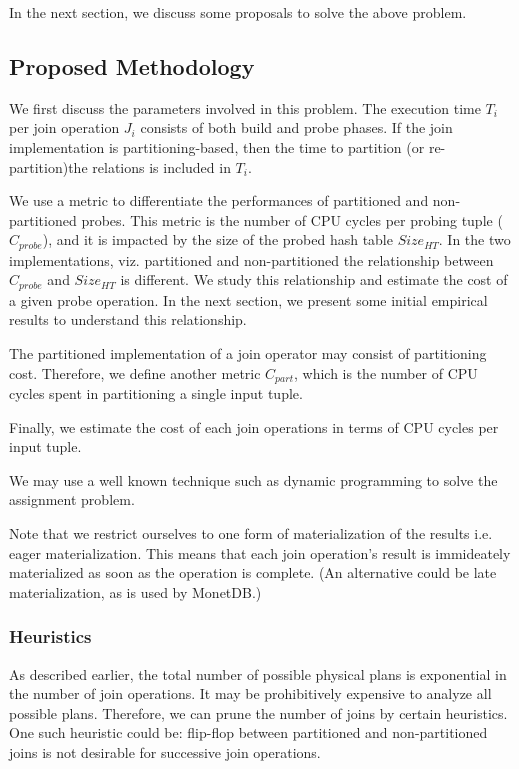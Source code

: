 In the next section, we discuss some proposals to solve the above problem. 

\subsection{Proposed Methodology}
We first discuss the parameters involved in this problem. 
The execution time $T_i$ per join operation $J_i$ consists of both build and probe phases.
If the join implementation is partitioning-based, then the time to partition (or re-partition)the relations is included in $T_i$.
 
We use a metric to differentiate the performances of partitioned and non-partitioned probes. 
This metric is the number of CPU cycles per probing tuple ($C_{probe}$), and it is impacted by the size of the probed hash table $Size_{HT}$. 
In the two implementations, viz. partitioned and non-partitioned the relationship between $C_{probe}$ and $Size_{HT}$ is different. 
We study this relationship and estimate the cost of a given probe operation. 
In the next section, we present some initial empirical results to understand this relationship.

The partitioned implementation of a join operator may consist of partitioning cost. 
Therefore, we define another metric $C_{part}$, which is the number of CPU cycles spent in partitioning a single input tuple. 

Finally, we estimate the cost of each join operations in terms of CPU cycles per input tuple. 

We may use a well known technique such as dynamic programming to solve the assignment problem. 

Note that we restrict ourselves to one form of materialization of the results i.e. eager materialization. 
This means that each join operation's result is immideately materialized as soon as the operation is complete. 
(An alternative could be late materialization, as is used by MonetDB.)

\subsubsection{Heuristics}
As described earlier, the total number of possible physical plans is exponential in the number of join operations. 
It may be prohibitively expensive to analyze all possible plans. 
Therefore, we can prune the number of joins by certain heuristics. 
One such heuristic could be: flip-flop between partitioned and non-partitioned joins is not desirable for successive join operations. 